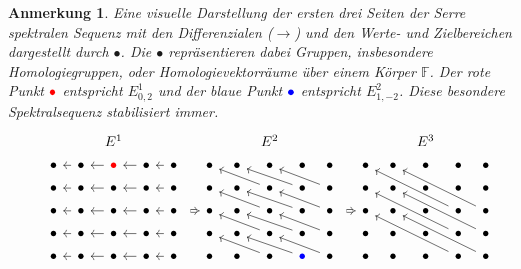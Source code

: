 \documentclass[12pt, hidelinks]{article}
\numberwithin{conj}{section}
\newtheorem{remark}[conj]{Anmerkung}
\begin{document}
\begin{remark}
Eine visuelle Darstellung der ersten drei Seiten der Serre spektralen Sequenz mit den Differenzialen ($\rightarrow$) und den Werte- und Zielbereichen dargestellt durch $\bullet$. Die $\bullet$ repräsentieren dabei Gruppen, insbesondere Homologiegruppen, oder Homologievektorräume über einem Körper $\mathbb{F}$. Der rote Punkt $\color{red}\bullet$ entspricht $E^1_{0,2}$ und der blaue Punkt $\color{blue}\bullet$ entspricht $E^2_{1,-2}$. Diese besondere Spektralsequenz stabilisiert immer.
\[
\begin{tikzcd}[sep=tiny]
    &&& {E^1} &&&&&& {E^2} &&&&&& {E^3} \\
    & \bullet & \bullet & {\color{red}\bullet} & \bullet & \bullet && \bullet & \bullet & \bullet & \bullet & \bullet && \bullet & \bullet & \bullet & \bullet & \bullet \\
    {} & \bullet & \bullet & \bullet & \bullet & \bullet && \bullet & \bullet & \bullet & \bullet & \bullet && \bullet & \bullet & \bullet & \bullet & \bullet \\
    & \bullet & \bullet & \bullet & \bullet & \bullet && \bullet & \bullet & \bullet & \bullet & \bullet && \bullet & \bullet & \bullet & \bullet & \bullet \\
    & \bullet & \bullet & \bullet & \bullet & \bullet && \bullet & \bullet & \bullet & \bullet & \bullet && \bullet & \bullet & \bullet & \bullet & \bullet \\
    & \bullet & \bullet & \bullet & \bullet & \bullet && \bullet & \bullet & \bullet & {\color{blue}\bullet} & \bullet && \bullet & \bullet & \bullet & \bullet & \bullet
    \arrow[from=2-3, to=2-2]
    \arrow[from=2-4, to=2-3]
    \arrow[from=2-5, to=2-4]
    \arrow[from=2-6, to=2-5]
    \arrow[from=3-3, to=3-2]
    \arrow[from=3-4, to=3-3]
    \arrow[from=3-5, to=3-4]
    \arrow[from=3-6, to=3-5]
    \arrow[from=3-10, to=2-8]
    \arrow[from=3-11, to=2-9]
    \arrow[from=3-12, to=2-10]
    \arrow[from=4-3, to=4-2]
    \arrow[from=4-4, to=4-3]
    \arrow[from=4-5, to=4-4]
    \arrow[from=4-6, to=4-5]
    \arrow[shorten <=5pt, Rightarrow, from=4-6, to=4-8]
    \arrow[from=4-10, to=3-8]
    \arrow[from=4-11, to=3-9]
    \arrow[from=4-12, to=3-10]
    \arrow[shorten <=5pt, Rightarrow, from=4-12, to=4-14]
    \arrow[from=4-17, to=2-14]
    \arrow[from=4-18, to=2-15]
    \arrow[from=5-3, to=5-2]
    \arrow[from=5-4, to=5-3]
    \arrow[from=5-5, to=5-4]
    \arrow[from=5-6, to=5-5]
    \arrow[from=5-10, to=4-8]
    \arrow[from=5-11, to=4-9]
    \arrow[from=5-12, to=4-10]
    \arrow[from=5-17, to=3-14]
    \arrow[from=5-18, to=3-15]
    \arrow[from=6-3, to=6-2]
    \arrow[from=6-4, to=6-3]
    \arrow[from=6-5, to=6-4]
    \arrow[from=6-6, to=6-5]
    \arrow[from=6-10, to=5-8]
    \arrow[from=6-11, to=5-9]
    \arrow[from=6-12, to=5-10]
    \arrow[from=6-17, to=4-14]
    \arrow[from=6-18, to=4-15]
\end{tikzcd}
\]
\end{remark}
\end{document}
